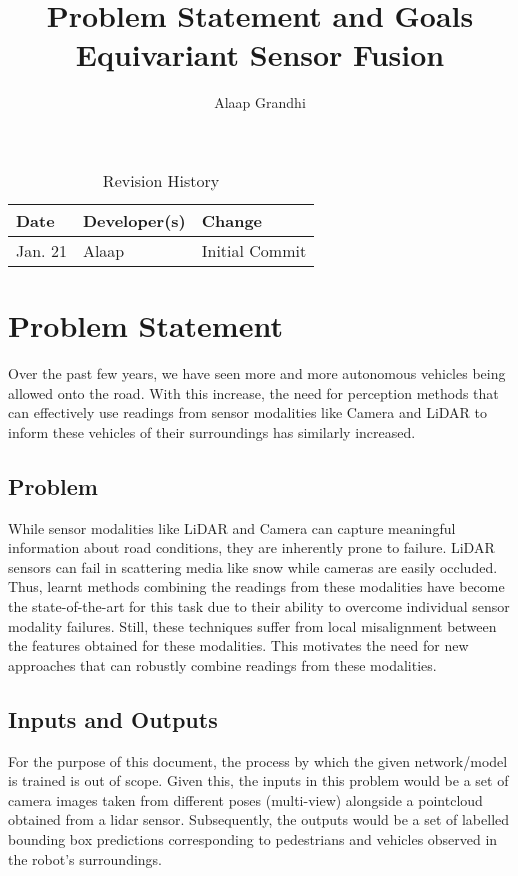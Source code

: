 \documentclass{article}
\title{Problem Statement and Goals\\Equivariant Sensor Fusion}
\author{Alaap Grandhi}
\date{}
\begin{document}
\maketitle

\begin{table}[hp]
\caption{Revision History} \label{TblRevisionHistory}
\begin{tabularx}{\textwidth}{llX}
\toprule
\textbf{Date} & \textbf{Developer(s)} & \textbf{Change}\\
\midrule
Jan. 21 & Alaap & Initial Commit\\
\bottomrule
\end{tabularx}
\end{table}

\section{Problem Statement}


Over the past few years, we have seen more and more autonomous vehicles being allowed onto the road. 
With this increase, the need for perception methods that can effectively use readings from sensor 
modalities like Camera and LiDAR to inform these vehicles of their surroundings has similarly increased.

\subsection{Problem} 
While sensor modalities like LiDAR and Camera can capture meaningful information about road conditions,
they are inherently prone to failure. LiDAR sensors can fail in scattering media like snow while cameras
are easily occluded. Thus, learnt methods combining the readings from these modalities have become the 
state-of-the-art for this task due to their ability to overcome individual sensor modality failures.
Still, these techniques suffer from local misalignment between the features obtained for these modalities. 
This motivates the need for new approaches that can robustly combine readings from these modalities.  

\subsection{Inputs and Outputs}
For the purpose of this document, the process by which the given network/model is trained is out of scope. 
Given this, the inputs in this problem would be a set of camera images taken from different poses (multi-view) alongside a 
pointcloud obtained from a lidar sensor. Subsequently, the outputs would be a set of labelled bounding box predictions 
corresponding to pedestrians and vehicles observed in the robot's surroundings. 
\end{document}
